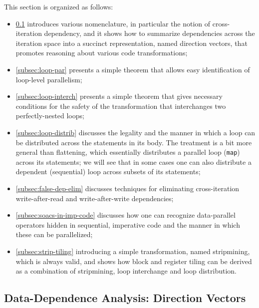 \documentclass[acmsmall,review]{acmart}\settopmatter{printfolios=true,printccs=false,printacmref=false}
\begin{document}
This section is organized as follows:
\begin{itemize}
    \item \cref{subsec:dir-vct} introduces various nomenclature,
        in particular the notion of cross-iteration dependency, and 
        it shows how to summarize dependencies across the iteration 
        space into a succinct representation, named direction vectors, 
        that promotes reasoning about various code transformations;
    \item \cref{subsec:loop-par} presents a simple theorem
        that allows easy identification of loop-level parallelism;
    \item \cref{subsec:loop-interch} presents a simple
        theorem that gives necessary conditions for the safety 
        of the transformation that interchanges two perfectly-nested
        loops;
    \item \cref{subsec:loop-distrib} discusses the legality and
        the manner in which a loop can be distributed across the 
        statements in its body. The treatment is a bit more general
        than flattening, which essentially distributes a parallel loop
        (\lstinline{map}) across its statements; we will see that in 
        some cases one can also distribute a dependent (sequential) 
        loop across subsets of its statements;
    \item \cref{subsec:false-dep-elim} discusses techniques for 
        eliminating cross-iteration write-after-read and 
        write-after-write dependencies;
    \item \cref{subsec:soacs-in-imp-code} discusses how one can
        recognize data-parallel operators hidden in sequential, 
        imperative code and the manner in which these can be 
        parallelized;
    \item \cref{subsec:strip-tiling} introducing a simple
        transformation, named stripmining, which is always valid,
        and shows how block and register tiling can be derived 
        as a combination of stripmining, loop interchange and
        loop distribution.
\end{itemize}

\subsection{Data-Dependence Analysis: Direction Vectors}
\label{subsec:dir-vct}
\end{document}
